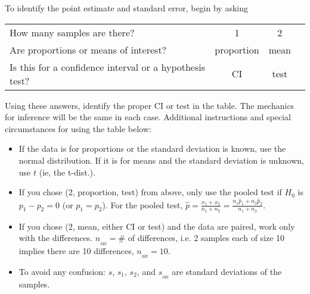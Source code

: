 \documentclass[11pt]{article}
\begin{document}
\noindent To identify the point estimate and standard error, begin by asking
\small
\begin{center}
\begin{tabular}{l c c c}
How many samples are there? & 1 & 2 & \text{ }\text{ }\text{ }\text{ }\text{ } \\
Are proportions or means of interest? & proportion & mean \\
Is this for a confidence interval or a hypothesis test? & CI & test
\end{tabular}
\end{center}
\normalsize
Using these answers, identify the proper CI or test in the table. The mechanics for inference will be the same in each case. Additional instructions and special circumstances for using the table below:
\begin{itemize}
\setlength{\itemsep}{0mm}
\item If the data is for proportions or the standard deviation is known, use the normal distribution. If it is for means and the standard deviation is unknown, use $t$ (ie, the t-dist.).
\item If you chose (2, proportion, test) from above, only use the pooled test if $H_0$ is $p_1-p_2=0$ (or $p_1=p_2$). For the pooled test, $\hat{p} = \frac{x_1 + x_2}{n_1+n_2} = \frac{n_1\hat{p}_1 + n_2\hat{p}_2}{n_1+n_2}$.
\item If you chose (2, mean, either CI or test) and the data are paired, work only with the differences. $n_{_{\text{diff}}}=\#$ of differences, i.e. 2 samples each of size 10 implies there are 10 differences, $n_{_{\text{diff}}}=10$.
\item To avoid any confusion: $s$, $s_1$, $s_2$, and $s_{_{\text{diff}}}$ are standard deviations of the samples.
\end{itemize}
\end{document}
